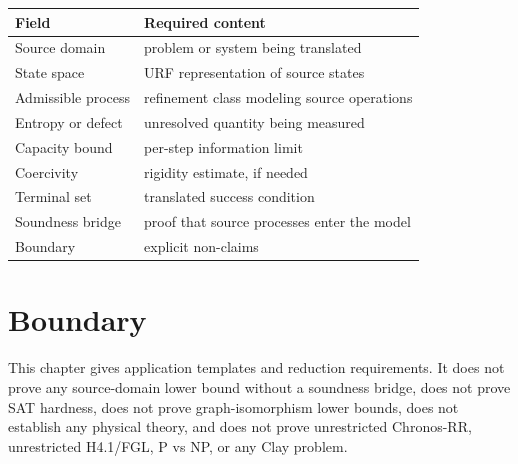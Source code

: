 \begin{center}
\begin{tabular}{ll}
\toprule
Field & Required content \\
\midrule
Source domain & problem or system being translated \\
State space & URF representation of source states \\
Admissible process & refinement class modeling source operations \\
Entropy or defect & unresolved quantity being measured \\
Capacity bound & per-step information limit \\
Coercivity & rigidity estimate, if needed \\
Terminal set & translated success condition \\
Soundness bridge & proof that source processes enter the model \\
Boundary & explicit non-claims \\
\bottomrule
\end{tabular}
\end{center}

\section{Boundary}

This chapter gives application templates and reduction requirements. It does
not prove any source-domain lower bound without a soundness bridge, does not
prove SAT hardness, does not prove graph-isomorphism lower bounds, does not
establish any physical theory, and does not prove unrestricted Chronos-RR,
unrestricted H4.1/FGL, P vs NP, or any Clay problem.
